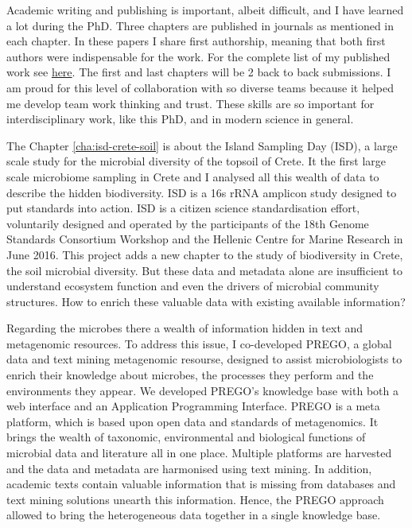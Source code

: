 \documentclass[
11pt, %
english, %
singlespacing, %
liststotoc, %
toctotoc, %
headsepline, %
]{MastersDoctoralThesis} %
\begin{document}
Academic writing and publishing is important, albeit difficult, and I have learned a
lot during the PhD. Three chapters are published in journals as
mentioned in each chapter. In these papers I share first authorship, meaning that 
both first authors were indispensable for the work. For the complete list of my published work see \hyperref[cv:my_refs]{here}.
The first and last chapters will be 2 back to back submissions. I am proud for this level of collaboration
with so diverse teams because it helped me develop team work thinking and trust. These skills are so important 
for interdisciplinary work, like this PhD, and in modern science in general.

The Chapter \ref{cha:isd-crete-soil} is about the Island Sampling Day (ISD), a large scale study for the microbial diversity of the
topsoil of Crete. It the first large scale microbiome sampling in Crete and I analysed
all this wealth of data to describe the hidden biodiversity. ISD is a 16s rRNA amplicon study designed to put standards into action. 
ISD is a citizen science standardisation effort, voluntarily designed and
operated by the participants of the 18th Genome Standards Consortium
Workshop and the Hellenic Centre for Marine Research in June 2016.
This project adds a new chapter to the study of biodiversity in Crete,
the soil microbial diversity. But these data and metadata alone are 
insufficient to understand ecosystem function and even the drivers 
of microbial community structures. How to enrich these valuable data 
with existing available information? 

Regarding the microbes there a wealth of information hidden in text and metagenomic resources.
To address this issue, I co-developed PREGO, a global data and text mining metagenomic resourse, designed to assist microbiologists
to enrich their knowledge about microbes, the processes they perform and the environments 
they appear. We developed PREGO's knowledge base with both a web interface and an Application Programming Interface.
PREGO is a meta platform, which is based upon open data and standards of metagenomics. 
It brings the wealth of taxonomic, environmental and biological functions of 
microbial data and literature all in one place. Multiple platforms are harvested and the data 
and metadata are harmonised using text mining. In addition, academic texts contain 
valuable information that is missing from databases and text mining solutions unearth 
this information. Hence, the PREGO approach allowed to bring the heterogeneous
data together in a single knowledge base. 
\end{document}
